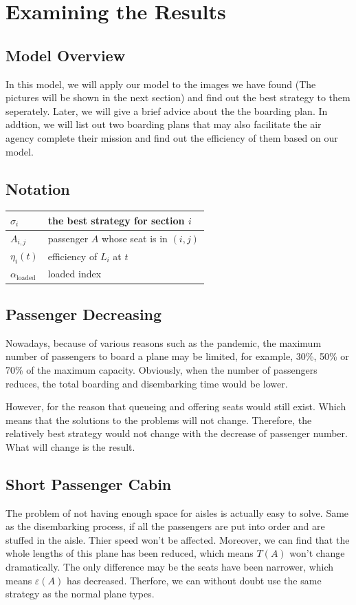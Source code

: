 \documentclass{article}
\theoremstyle{definition}
\theoremstyle{remark}
\numberwithin{equation}{section}
\begin{document}
	\section{Examining the Results}
	\subsection{Model Overview}
	In this model, we will apply our model to the images we have found (The pictures will be shown in the next section) and find out the best strategy to them seperately. Later, we will give a brief advice about the the boarding plan. In addtion, we will list out two boarding plans that may also facilitate the air agency complete their mission and find out the efficiency of them based on our model.
	\subsection{Notation}
	\begin{center}
	\begin{tabular}{|l|l|}
		\hline
		$\sigma_i$&the best strategy for section $i$\\
		\hline
		$A_{i,j}$&passenger $A$ whose seat is in $\left(i,j\right)$\\
		\hline
		$\eta_i(t)$&efficiency of $L_i$ at $t$\\
		\hline
		$\alpha_\text{loaded}$&loaded index\\
		\hline
	\end{tabular}
	\end{center}
	\subsection{Passenger Decreasing}
	Nowadays, because of various reasons such as the pandemic, the maximum number of passengers to board a plane may be limited, for example, 30\%, 50\% or 70\% of the maximum capacity. Obviously, when the number of passengers reduces, the total boarding and disembarking time would be lower.

	However, for the reason that queueing and offering seats would still exist. Which means that the solutions to the problems will not change. Therefore, the relatively best strategy would not change with the decrease of passenger number.  What will change is the result.
	\subsection{Short Passenger Cabin}
	The problem of not having enough space for aisles is actually easy to solve. Same as the disembarking process, if all the passengers are put into order and  are stuffed in the aisle. Thier speed won't be affected. Moreover, we can find that the whole lengths of this plane has been reduced, which means $T(A)$ won't change dramatically. The only difference may be the seats have been narrower, which means $\varepsilon(A)$ has decreased. Therfore, we  can without doubt use the same strategy as the normal plane types.
\end{document}
